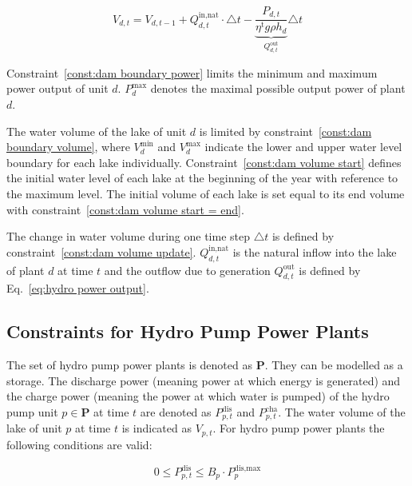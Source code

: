 \setlength{\belowdisplayskip}{12pt}
\begin{equation}\label{const:dam volume update}
    V_{d, t} = V_{d, t-1} + Q^{\text{in,nat}}_{d,t} \cdot \triangle t 
    - \underbrace{\frac{P_{d, t}}{\eta^{\text{t}} g \rho h_d}}_{Q^{\text{out}}_{d,t}} \triangle t
\end{equation}

\noindent Constraint~\eqref{const:dam boundary power} limits the minimum and maximum power output of unit $d$. $P^{\text{max}}_{d}$ denotes the maximal possible output power of plant $d$. 

\noindent The water volume of the lake of unit $d$ is limited by constraint~\eqref{const:dam boundary volume}, where $V^{\text{min}}_{d}$ and $V^{\text{max}}_{d}$ indicate the lower and upper water level boundary for each lake individually. Constraint~\eqref{const:dam volume start}  defines the initial water level of each lake at the beginning of the year with reference to the maximum level. The initial volume of each lake is set equal to its end volume with constraint~\eqref{const:dam volume start = end}. 

\noindent The change in water volume during one time step $\triangle t$ is defined by constraint~\eqref{const:dam volume update}. $Q^{\text{in,nat}}_{d,t}$ is the natural inflow into the lake of plant $d$ at time $t$ and the outflow due to generation $Q^{\text{out}}_{d,t}$ is defined by Eq.~\eqref{eq:hydro power output}. 




\subsection{Constraints for Hydro Pump Power Plants}
The set of hydro pump power plants is denoted as $\textbf{P}$. They can be modelled as a storage. The discharge power (meaning power at which energy is generated) and the charge power (meaning the power at which water is pumped) of the hydro pump unit $p \in \textbf{P}$ at time $t$ are denoted as $P^{\text{dis}}_{p, t}$ and $P^{\text{cha}}_{p, t}$. The water volume of the lake of unit $p$ at time $t$ is indicated as $V_{p, t}$. For hydro pump power plants the following conditions are valid: 

\setlength{\belowdisplayskip}{0pt} 
\setlength{\abovedisplayskip}{0pt} 

\begin{equation}\label{const:pump boundary discharge power}
    0 \leq P^{\text{dis}}_{p, t} \leq B_p \cdot P^{\text{dis,max}}_{p}
\end{equation}

